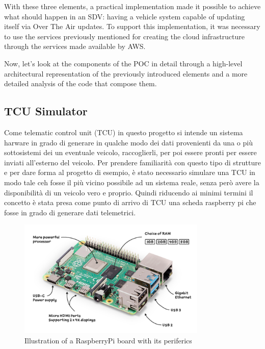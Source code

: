 With these three elements, a practical implementation made it possible to achieve what should happen in an SDV: having a vehicle system capable of updating itself via Over The Air updates. To support this implementation, it was necessary to use the services previously mentioned for creating the cloud infrastructure through the services made available by AWS.

Now, let's look at the components of the POC in detail through a high-level architectural representation of the previously introduced elements and a more detailed analysis of the code that compose them.

\subsection{TCU Simulator}
Come telematic control unit (TCU) in questo progetto si intende un sistema harware in grado di generare in qualche modo dei dati provenienti da una o più sottosistemi dei un eventuale veicolo, raccoglierli, per poi essere pronti per essere inviati all'esterno del veicolo. Per prendere familiarità con questo tipo di strutture e per dare forma al progetto di esempio, è stato necessario simulare una TCU in modo tale ceh fosse il più vicino possibile ad un sistema reale, senza però avere la disponibilità di un veicolo vero e proprio. Quindi riducendo ai minimi termini il concetto è stata presa come punto di arrivo di TCU una scheda raspberry pi che fosse in grado di generare dati telemetrici.

\begin{figure}[h]  %
    \centering
    \includegraphics[width=0.8\textwidth]{images/raspberrypi.png}  %
    \caption{Illustration of a RaspberryPi board with its periferics \cite{raspberrypi}}
    \label{fig:raspberrypi}
\end{figure}

